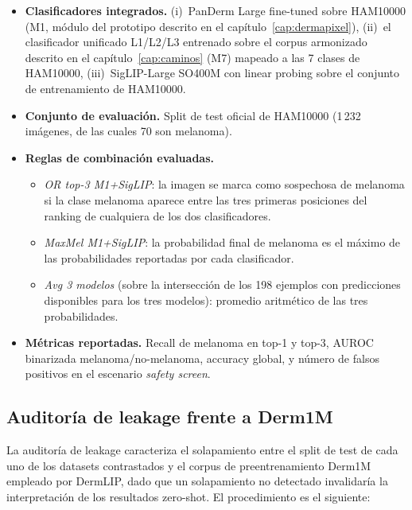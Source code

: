 \begin{itemize}
\item \textbf{Clasificadores integrados.}
(i)~PanDerm Large fine-tuned sobre HAM10000 (M1, módulo del
prototipo descrito en el capítulo~\ref{cap:dermapixel}),
(ii)~el clasificador unificado L1/L2/L3 entrenado sobre el corpus
armonizado descrito en el capítulo~\ref{cap:caminos} (M7) mapeado
a las 7 clases de HAM10000, (iii)~SigLIP-Large SO400M con linear
probing sobre el conjunto de entrenamiento de HAM10000.
\item \textbf{Conjunto de evaluación.} Split de test oficial de
HAM10000 (1\,232 imágenes, de las cuales 70 son melanoma).
\item \textbf{Reglas de combinación evaluadas.}
\begin{itemize}
\item \emph{OR top-3 M1+SigLIP}: la imagen se marca como
sospechosa de melanoma si la clase melanoma aparece entre las
tres primeras posiciones del ranking de cualquiera de los dos
clasificadores.
\item \emph{MaxMel M1+SigLIP}: la probabilidad final de melanoma
es el máximo de las probabilidades reportadas por cada
clasificador.
\item \emph{Avg 3 modelos} (sobre la intersección de los 198
ejemplos con predicciones disponibles para los tres modelos):
promedio aritmético de las tres probabilidades.
\end{itemize}
\item \textbf{Métricas reportadas.} Recall de melanoma en top-1 y
top-3, AUROC binarizada melanoma/no-melanoma, accuracy global, y
número de falsos positivos en el escenario \emph{safety screen}.
\end{itemize}

\subsection{Auditoría de leakage frente a Derm1M}
\label{sec:leakage-protocol}

La auditoría de leakage caracteriza el solapamiento entre el split
de test de cada uno de los datasets contrastados y el corpus de
preentrenamiento Derm1M empleado por DermLIP, dado que un
solapamiento no detectado invalidaría la interpretación de los
resultados zero-shot. El procedimiento es el siguiente:

